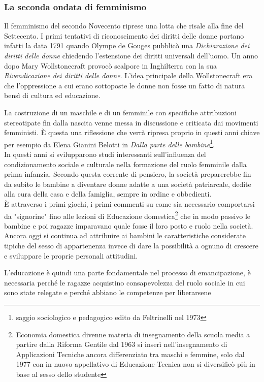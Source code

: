 \subsubsection{La seconda ondata di femminismo}
Il femminismo del secondo Novecento riprese una lotta che risale alla fine del Settecento.
I primi tentativi di riconoscimento dei diritti delle donne portano infatti la data 1791 quando Olympe de Gouges pubblicò una \textit{Dichiarazione dei diritti delle donne} chiedendo l'estensione dei diritti universali dell'uomo.
Un anno dopo Mary Wollstonecraft provocò scalpore in Inghilterra con la sua \textit{Rivendicazione dei diritti delle donne}.
L'idea principale della Wollstonecraft era che l'oppressione a cui erano sottoposte le donne non fosse un fatto di natura bensì di cultura ed educazione.

La costruzione di un maschile e di un femminile con specifiche attribuzioni stereotipate fin dalla nascita venne messa in discussione e criticata dai movimenti femministi.
È questa una riflessione che verrà ripresa proprio in questi anni chiave per esempio da Elena Gianini Belotti in \textit{Dalla parte delle bambine}\footnote{saggio sociologico e pedagogico edito da Feltrinelli nel 1973}.
\\In questi anni si svilupparono studi interessanti sull'influenza del condizionamento sociale e culturale nella formazione del ruolo femminile dalla prima infanzia.
Secondo questa corrente di pensiero, la società preparerebbe fin da subito le bambine a diventare donne adatte a una società patriarcale, dedite alla cura della casa e della famiglia, sempre in ordine e obbedienti.
\\È attraverso i primi giochi, i primi commenti su come sia necessario comportarsi da "signorine" fino alle lezioni di Educazione domestica\footnote{Economia domestica divenne materia di insegnamento della scuola media a partire dalla Riforma Gentile dal 1963 si inserì nell'insegnamento di Applicazioni Tecniche ancora differenziato tra maschi e femmine, solo dal 1977 con in nuovo appellativo di Educazione Tecnica non si diversificò più in base al sesso dello studente} che in modo passivo le bambine e poi ragazze imparavano quale fosse il loro posto e ruolo nella società.
Ancora oggi si continua ad attribuire ai bambini le caratteristiche considerate tipiche del sesso di appartenenza invece di dare la possibilità a ognuno di crescere e sviluppare le proprie personali attitudini.

L'educazione è quindi una parte fondamentale nel processo di emancipazione, è necessaria perché le ragazze acquistino consapevolezza del ruolo sociale in cui sono state relegate e perché abbiano le competenze per liberarsene


